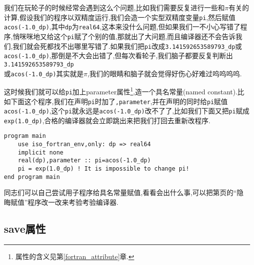 我们在玩轮子的时候经常会遇到这么个问题,比如我们需要反复进行一些和$\pi$有关的计算,假设我们的程序以双精度运行,我们会造一个实型双精度变量\texttt{pi},然后赋值\texttt{acos(-1.0\_{}dp)},其中\texttt{dp}为\texttt{real64},这本来没什么问题,但如果我们一不小心写错了程序,悄咪咪地又给这个\texttt{pi}赋了个别的值,那就出了大问题,而且编译器还不会告诉我们,我们就会死都找不出哪里写错了.如果我们把\texttt{pi}改成\texttt{3.141592653589793\_{}dp}或\texttt{acos(-1.0\_{}dp)},那倒是不大会出错了,但每次看轮子,我们脑子都要反复判断出\texttt{3.141592653589793\_{}dp}\\或\texttt{acos(-1.0\_{}dp)}其实就是$\pi$,我们的眼睛和脑子就会觉得好伤心好难过呜呜呜呜.

这时候我们就可以给\texttt{pi}加上parameter属性\footnote{属性的含义见第\ref{fortran_attribute}章.},造一个具名常量(named constant).比如下面这个程序,我们在声明\texttt{pi}时加了\texttt{,parameter},并在声明的同时给\texttt{pi}赋值\texttt{acos(-1.0\_{}dp)},这个\texttt{pi}就永远是\texttt{acos(-1.0\_{}dp)}改不了了,比如我们下面又把\texttt{pi}赋成\texttt{exp(1.0\_{}dp)},合格的编译器就会立即跳出来把我们打回去重新改程序.
\begin{lstlisting}
program main
    use iso_fortran_env,only: dp => real64
    implicit none
    real(dp),parameter :: pi=acos(-1.0_dp)
    pi = exp(1.0_dp) ! It is impossible to change pi!
end program main
\end{lstlisting}
同志们可以自己尝试用子程序给具名常量赋值,看看会出什么事,可以把第\pageref{secret_assignment}页的``隐晦赋值''程序改一改来考验考验编译器.

\subsection{save属性}

